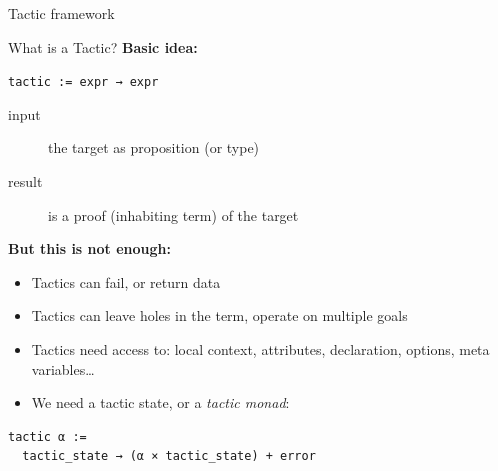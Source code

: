 \documentclass[usenames,dvipsnames]{beamer}
\newcommand{\sect}[1]{\begin{frame}
  \begin{center} \Huge{\usebeamercolor[fg]{structure} #1} \end{center}
  \end{frame}
  }
\begin{document}
\sect{Tactic framework}

\begin{frame}[fragile]{What is a Tactic?}
  \textbf{Basic idea:}
  \begin{center} \lstinline$tactic := expr → expr$ \end{center}
  \begin{description}
    \item[input] the target as proposition (or type)
    \item[result] is a proof (inhabiting term) of the target
  \end{description}

  \textbf{But this is not enough:}
  \begin{itemize}
    \item Tactics can fail, or return data
    \item Tactics can leave holes in the term, operate on multiple goals
    \item Tactics need access to: local context, attributes, declaration, options,
      meta variables\ldots
    \item We need a tactic state, or a \emph{tactic monad}:
  \end{itemize}
\begin{lstlisting}
tactic α :=
  tactic_state → (α × tactic_state) + error
\end{lstlisting}

\end{frame}
\end{document}
